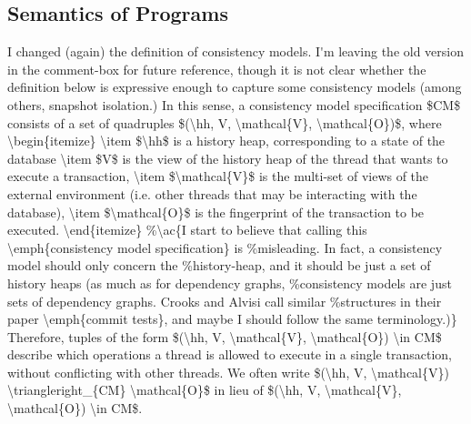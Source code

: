 \documentclass[a4paper,UKenglish]{article}%
\theoremstyle{plain}
\begin{document}
\subsection{Semantics of Programs}
\label{sec:semantics.programs}

\ac{
I changed (again) the definition of consistency models. I'm leaving the old 
version in the comment-box for future reference, though it is not clear 
whether the definition below is expressive enough to capture some consistency models (among 
others, snapshot isolation.)

In this sense, a consistency model specification $CM$ consists of a set of quadruples 
$(\hh, V, \mathcal{V}, \mathcal{O})$, where 
\begin{itemize}
\item $\hh$ is a history heap, corresponding to a state of the database
\item $V$ is the view of the history heap of the thread that wants to execute a 
transaction, 
\item $\mathcal{V}$ is the multi-set of views of the external environment (i.e. other 
threads that may be interacting with the database), 
\item $\mathcal{O}$ is the fingerprint of the transaction to be executed.
\end{itemize}

Therefore, tuples of the form $(\hh, V, \mathcal{V}, \mathcal{O}) \in CM$ describe 
which operations a thread is allowed to execute in a single transaction, without conflicting 
with other threads. We often write $(\hh, V, \mathcal{V}) \triangleright_{CM} \mathcal{O}$ 
in lieu of $(\hh, V, \mathcal{V}, \mathcal{O}) \in CM$. }
\end{document}
